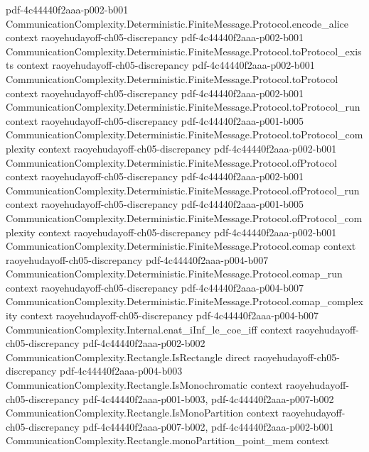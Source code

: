 \begin{lemma}
  {pdf-4c44440f2aaa-p002-b001}
\proofstep
  {CommunicationComplexity.Deterministic.FiniteMessage.Protocol.encode_alice}
  {context}
  {raoyehudayoff-ch05-discrepancy}
  {pdf-4c44440f2aaa-p002-b001}
\proofstep
  {CommunicationComplexity.Deterministic.FiniteMessage.Protocol.toProtocol_exists}
  {context}
  {raoyehudayoff-ch05-discrepancy}
  {pdf-4c44440f2aaa-p002-b001}
\proofstep
  {CommunicationComplexity.Deterministic.FiniteMessage.Protocol.toProtocol}
  {context}
  {raoyehudayoff-ch05-discrepancy}
  {pdf-4c44440f2aaa-p002-b001}
\proofstep
  {CommunicationComplexity.Deterministic.FiniteMessage.Protocol.toProtocol_run}
  {context}
  {raoyehudayoff-ch05-discrepancy}
  {pdf-4c44440f2aaa-p001-b005}
\proofstep
  {CommunicationComplexity.Deterministic.FiniteMessage.Protocol.toProtocol_complexity}
  {context}
  {raoyehudayoff-ch05-discrepancy}
  {pdf-4c44440f2aaa-p002-b001}
\proofstep
  {CommunicationComplexity.Deterministic.FiniteMessage.Protocol.ofProtocol}
  {context}
  {raoyehudayoff-ch05-discrepancy}
  {pdf-4c44440f2aaa-p002-b001}
\proofstep
  {CommunicationComplexity.Deterministic.FiniteMessage.Protocol.ofProtocol_run}
  {context}
  {raoyehudayoff-ch05-discrepancy}
  {pdf-4c44440f2aaa-p001-b005}
\proofstep
  {CommunicationComplexity.Deterministic.FiniteMessage.Protocol.ofProtocol_complexity}
  {context}
  {raoyehudayoff-ch05-discrepancy}
  {pdf-4c44440f2aaa-p002-b001}
\proofstep
  {CommunicationComplexity.Deterministic.FiniteMessage.Protocol.comap}
  {context}
  {raoyehudayoff-ch05-discrepancy}
  {pdf-4c44440f2aaa-p004-b007}
\proofstep
  {CommunicationComplexity.Deterministic.FiniteMessage.Protocol.comap_run}
  {context}
  {raoyehudayoff-ch05-discrepancy}
  {pdf-4c44440f2aaa-p004-b007}
\proofstep
  {CommunicationComplexity.Deterministic.FiniteMessage.Protocol.comap_complexity}
  {context}
  {raoyehudayoff-ch05-discrepancy}
  {pdf-4c44440f2aaa-p004-b007}
\proofstep
  {CommunicationComplexity.Internal.enat_iInf_le_coe_iff}
  {context}
  {raoyehudayoff-ch05-discrepancy}
  {pdf-4c44440f2aaa-p002-b002}
\proofstep
  {CommunicationComplexity.Rectangle.IsRectangle}
  {direct}
  {raoyehudayoff-ch05-discrepancy}
  {pdf-4c44440f2aaa-p004-b003}
\proofstep
  {CommunicationComplexity.Rectangle.IsMonochromatic}
  {context}
  {raoyehudayoff-ch05-discrepancy}
  {pdf-4c44440f2aaa-p001-b003,
    pdf-4c44440f2aaa-p007-b002}
\proofstep
  {CommunicationComplexity.Rectangle.IsMonoPartition}
  {context}
  {raoyehudayoff-ch05-discrepancy}
  {pdf-4c44440f2aaa-p007-b002,
    pdf-4c44440f2aaa-p002-b001}
\proofstep
  {CommunicationComplexity.Rectangle.monoPartition_point_mem}
  {context}

\end{lemma}
